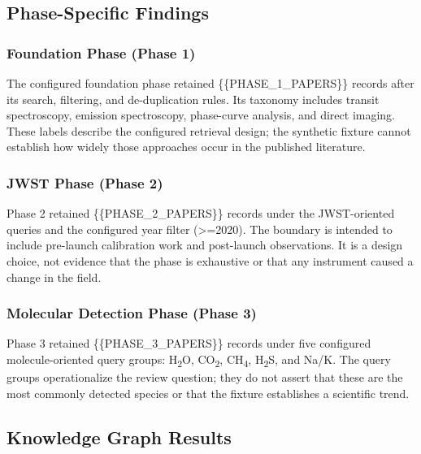 \documentclass[
]{article}
\begin{document}
\subsection{Phase-Specific Findings}\label{phase-specific-findings}

\subsubsection{Foundation Phase (Phase
1)}\label{foundation-phase-phase-1}

The configured foundation phase retained \{\{PHASE\_1\_PAPERS\}\}
records after its search, filtering, and de-duplication rules. Its
taxonomy includes transit spectroscopy, emission spectroscopy,
phase-curve analysis, and direct imaging. These labels describe the
configured retrieval design; the synthetic fixture cannot establish how
widely those approaches occur in the published literature.

\subsubsection{JWST Phase (Phase 2)}\label{jwst-phase-phase-2}

Phase 2 retained \{\{PHASE\_2\_PAPERS\}\} records under the
JWST-oriented queries and the configured year filter (\texorpdfstring{\textgreater{}=}{>=}2020). The
boundary is intended to include pre-launch calibration work and
post-launch observations. It is a design choice, not evidence that the
phase is exhaustive or that any instrument caused a change in the field.

\subsubsection{Molecular Detection Phase (Phase
3)}\label{molecular-detection-phase-phase-3}

Phase 3 retained \{\{PHASE\_3\_PAPERS\}\} records under five configured
molecule-oriented query groups: H\texorpdfstring{\textsubscript{2}}{2}O, CO\texorpdfstring{\textsubscript{2}}{2}, CH\texorpdfstring{\textsubscript{4}}{4}, H\texorpdfstring{\textsubscript{2}}{2}S, and Na/K. The query
groups operationalize the review question; they do not assert that these
are the most commonly detected species or that the fixture establishes a
scientific trend.

\subsection{Knowledge Graph Results}\label{knowledge-graph-results}
\end{document}
